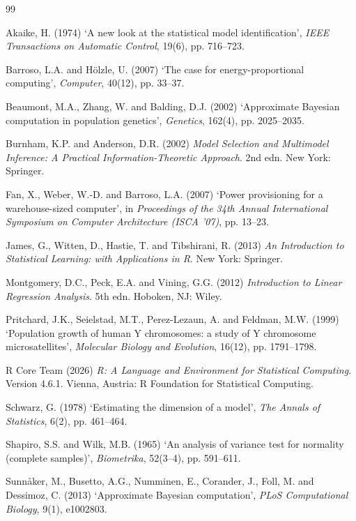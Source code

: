 \begin{thebibliography}{99}

Akaike, H. (1974) `A new look at the statistical model identification', \emph{IEEE Transactions on Automatic Control}, 19(6), pp. 716--723.

Barroso, L.A. and H{\"o}lzle, U. (2007) `The case for energy-proportional computing', \emph{Computer}, 40(12), pp. 33--37.

Beaumont, M.A., Zhang, W. and Balding, D.J. (2002) `Approximate Bayesian computation in population genetics', \emph{Genetics}, 162(4), pp. 2025--2035.

Burnham, K.P. and Anderson, D.R. (2002) \emph{Model Selection and Multimodel Inference: A Practical Information-Theoretic Approach}. 2nd edn. New York: Springer.

Fan, X., Weber, W.-D. and Barroso, L.A. (2007) `Power provisioning for a warehouse-sized computer', in \emph{Proceedings of the 34th Annual International Symposium on Computer Architecture (ISCA '07)}, pp. 13--23.

James, G., Witten, D., Hastie, T. and Tibshirani, R. (2013) \emph{An Introduction to Statistical Learning: with Applications in R}. New York: Springer.

Montgomery, D.C., Peck, E.A. and Vining, G.G. (2012) \emph{Introduction to Linear Regression Analysis}. 5th edn. Hoboken, NJ: Wiley.

Pritchard, J.K., Seielstad, M.T., Perez-Lezaun, A. and Feldman, M.W. (1999) `Population growth of human Y chromosomes: a study of Y chromosome microsatellites', \emph{Molecular Biology and Evolution}, 16(12), pp. 1791--1798.

R Core Team (2026) \emph{R: A Language and Environment for Statistical Computing}. Version 4.6.1. Vienna, Austria: R Foundation for Statistical Computing.

Schwarz, G. (1978) `Estimating the dimension of a model', \emph{The Annals of Statistics}, 6(2), pp. 461--464.

Shapiro, S.S. and Wilk, M.B. (1965) `An analysis of variance test for normality (complete samples)', \emph{Biometrika}, 52(3--4), pp. 591--611.

Sunn{\aa}ker, M., Busetto, A.G., Numminen, E., Corander, J., Foll, M. and Dessimoz, C. (2013) `Approximate Bayesian computation', \emph{PLoS Computational Biology}, 9(1), e1002803.

\end{thebibliography}
